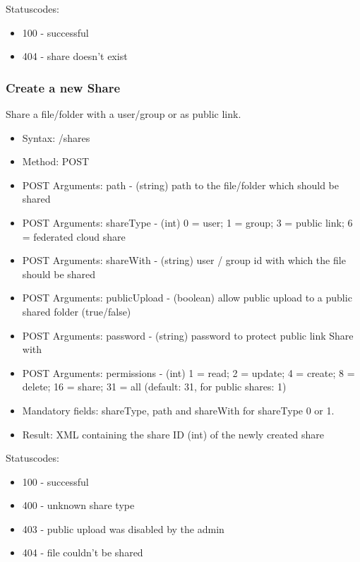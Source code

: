 \documentclass[letterpaper,10pt,english]{sphinxmanual}
\begin{document}
Statuscodes:
\begin{itemize}
\item {} 
100 - successful

\item {} 
404 - share doesn't exist

\end{itemize}


\subsubsection{Create a new Share}
\label{core/ocs-share-api:create-a-new-share}
Share a file/folder with a user/group or as public link.
\begin{itemize}
\item {} 
Syntax: /shares

\item {} 
Method: POST

\item {} 
POST Arguments: path - (string) path to the file/folder which should be shared

\item {} 
POST Arguments: shareType - (int) 0 = user; 1 = group; 3 = public link; 6 = federated cloud share

\item {} 
POST Arguments: shareWith - (string) user / group id with which the file should be shared

\item {} 
POST Arguments: publicUpload - (boolean) allow public upload to a public shared folder (true/false)

\item {} 
POST Arguments: password - (string) password to protect public link Share with

\item {} 
POST Arguments: permissions - (int) 1 = read; 2 = update; 4 = create; 8 = delete;
16 = share; 31 = all (default: 31, for public shares: 1)

\item {} 
Mandatory fields: shareType, path and shareWith for shareType 0 or 1.

\item {} 
Result: XML containing the share ID (int) of the newly created share

\end{itemize}

Statuscodes:
\begin{itemize}
\item {} 
100 - successful

\item {} 
400 - unknown share type

\item {} 
403 - public upload was disabled by the admin

\item {} 
404 - file couldn't be shared

\end{itemize}
\end{document}
